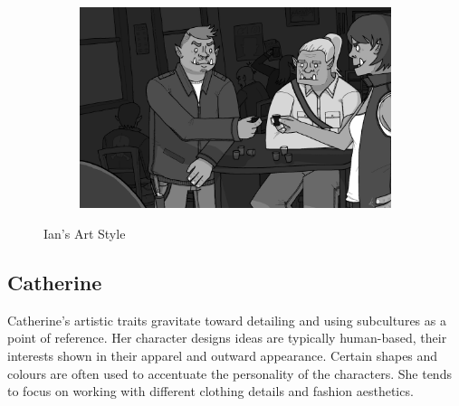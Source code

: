 \begin{figure}[H]
\begin{subfigure}{.4\textwidth}
    \centering
    \includegraphics[width=.9\linewidth]{images/ref_IAN04}
  \end{subfigure}
  \caption{Ian's Art Style}
  \label{fig:istyle}
\end{figure}

\clearpage
\subsection{Catherine}
Catherine's artistic traits gravitate toward detailing and using subcultures as a point of reference. Her character designs ideas are typically human-based, their interests shown in their apparel and outward appearance. Certain shapes and colours are often used to accentuate the personality of the characters. She tends to focus on working with different clothing details and fashion aesthetics.

